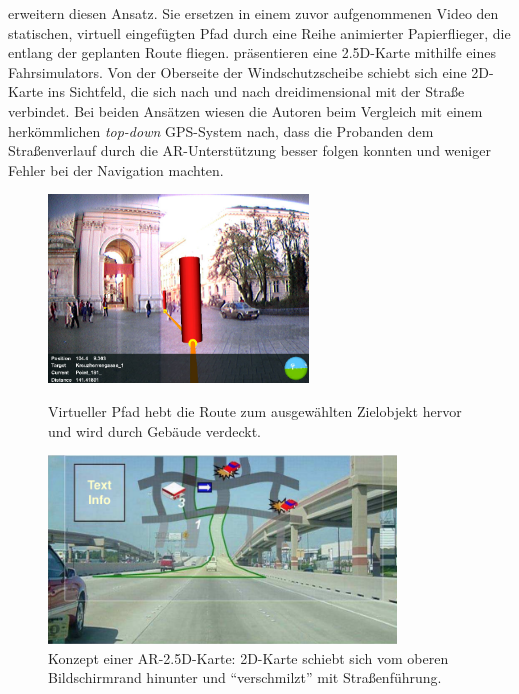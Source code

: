 \textcite{Bark2014} erweitern diesen Ansatz.
Sie ersetzen in einem zuvor aufgenommenen Video den statischen, virtuell eingefügten Pfad durch eine Reihe animierter Papierflieger, die entlang der geplanten Route fliegen.
\textcite{Kim2009} präsentieren eine 2.5D-Karte mithilfe eines Fahrsimulators.
Von der Oberseite der Windschutzscheibe schiebt sich eine 2D-Karte ins Sichtfeld, die sich nach und nach dreidimensional mit der Straße verbindet.
Bei beiden Ansätzen wiesen die Autoren beim Vergleich mit einem herkömmlichen \emph{top-down} GPS-System nach, dass die Probanden dem Straßenverlauf durch die AR-Unterstützung besser folgen konnten und weniger Fehler bei der Navigation machten.

\begin{figure}
\begin{minipage}[t]{0.48\textwidth}
    \centering
    \includegraphics[width=\textwidth, height=5cm]{figures/reitmayr2004_path}
    \caption{Virtueller Pfad hebt die Route zum ausgewählten Zielobjekt hervor und wird durch Gebäude verdeckt. \hfill}
    \label{fig:reitmayr2004_path}
\end{minipage}%
\hfill
\begin{minipage}[t]{0.48\textwidth}
    \centering
    \includegraphics[width=\textwidth, height=5cm]{figures/kim2009_concept_2_5d_map}
    \caption{Konzept einer AR-2.5D-Karte: 2D-Karte schiebt sich vom oberen Bildschirmrand hinunter und \enquote{verschmilzt} mit Straßenführung. \hfill}
    \label{fig:kim2009_2_5d_map}
\end{minipage}
\end{figure}

